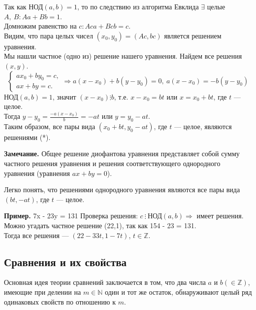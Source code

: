 \documentclass{article}
\begin{document}
            Так как \( \textrm{НОД}(a, b) = 1 \), то по следствию из алгоритма Евклида \( \exists \) целые \( A,\ B: Aa + Bb = 1 \).\\
            Домножим равенство на \( c: Aca + Bcb = c \).\\
            Видим, что пара целых чисел \( (x_0,y_0) = (Ac, bc) \) является решением уравнения.\\
            Мы нашли частное (одно из) решение нашего уравнения. Найдем все решения \( (x,y) \).\\

            \[ \begin{cases}
                ax_0 + by_0 = c,\\
                ax + by = c.
            \end{cases} \Rightarrow a(x - x_0) + b(y - y_0) = 0,\ a(x - x_0) = -b(y - y_0) \]
            \( \textrm{НОД}(a,b) = 1 \), значит \( (x - x_0) \vdots b \), т.е. \( x - x_0 = bt \) или \( x = x_0 + bt \), где \( t \) --- целое.\\
            Тогда \( y - y_0 = \frac{-a(x - x_0)}{b} = -at \) или \( y = y_0 - at \).\\
            Таким образом, все пары вида \( (x_0 + bt, y_0 - at) \), где \( t \) --- целое, являются решениями (*).

            \textbf{Замечание.} Общее решение диофантова уравнения представляет собой сумму частного решения уравнения и решения соответствующего однородного уравнения (уравнения \( ax + by = 0 \)).

            Легко понять, что решениями однородного уравнения являются все пары вида \( (bt, -at) \), где \( t \) --- целое.

            \textbf{Пример.} 7x - 23y = 131
            Проверка решения: \( c\ \vdots \ \textrm{НОД}(a,b) \Rightarrow \) имеет решения.\\ 
            Можно угадать частное решение (22,1), так как 154 - 23 = 131.\\
            Тогда все решения --- \( (22-33t,1-7t) \), \( t \in \mathbb{Z} \).

        \subsection{Сравнения и их свойства}
        	Основная идея теории сравнений заключается в том, что два числа \( a \) и \( b (\in \mathbb{Z}) \), имеющие при делении на \( m \in \mathbb{N} \) один и тот же остаток, обнаруживают целый ряд одинаковых свойств по отношению к \( m \).
\end{document}
